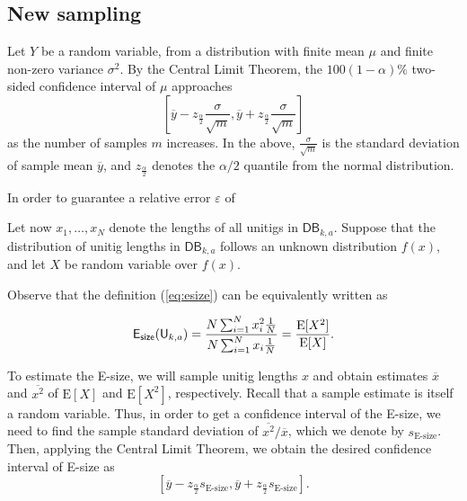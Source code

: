 \documentclass[a4paper,11pt]{article}
\newcommand{\DB}{\mathsf{DB}_{k,a}}
\newcommand{\U}{\mathsf{U}_{k,a}}
\newcommand{\esize}{{\sf E_{size}}}
\newcommand{\E}{\text{E}}
\begin{document}







\subsection{New sampling}

Let $Y$ be a random variable, from a distribution with finite mean $\mu$ and finite non-zero variance $\sigma^2$. By the Central Limit Theorem, the $100(1-\alpha)\%$ two-sided confidence interval of $\mu$ approaches 
\[\left[\overline{y} - z_{\frac{\alpha}{2}}\frac{\sigma}{\sqrt{m}} , \overline{y} + z_{\frac{\alpha}{2}}\frac{\sigma}{\sqrt{m}}\right] \]
as the number of samples $m$ increases. In the above, $\frac{\sigma}{\sqrt{m}}$ is the standard deviation of sample mean $\overline{y}$, and $z_{\frac{\alpha}{2}}$ denotes the $\alpha/2$ quantile from the normal distribution.

In order to guarantee a relative error $\varepsilon$ of 

Let now $x_1,\dots,x_N$ denote the lengths of all unitigs in $\DB$. Suppose that the distribution of unitig lengths in $\DB$ follows an unknown distribution $f(x)$, and let $X$ be random variable over $f(x)$.

Observe that the definition (\ref{eq:esize}) can be equivalently written as 

\[\esize(\U) = \frac{N \sum_{i = 1}^{N} x_i^2\frac{1}{N}}{N\sum_{i = 1}^{N} x_i\frac{1}{N}} = \frac{\E[X^2]}{\E[X]}.\]

To estimate the E-size, we will sample unitig lengths $x$ and obtain estimates $\overline{x}$ and $\overline{x^2}$ of $\E[X]$ and $\E[X^2]$, respectively. Recall that a sample estimate is itself a random variable. Thus, in order to get a confidence interval of the E-size, we need to find the sample standard deviation of $\overline{x^2}/\overline{x}$, which we denote by $s_{\text{E-size}}$. Then, applying the Central Limit Theorem, we obtain the desired confidence interval of E-size as 
\[\left[\overline{y} - z_{\frac{\alpha}{2}}s_{\text{E-size}} , \overline{y} + z_{\frac{\alpha}{2}}s_{\text{E-size}}\right]. \]
\end{document}
